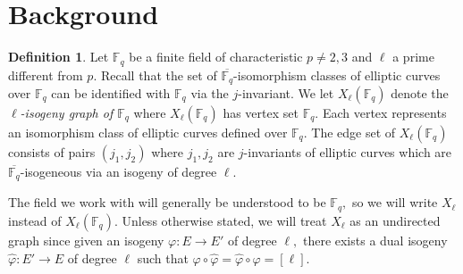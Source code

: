\documentclass[11pt,a4paper]{amsart}
\theoremstyle{plain}
\theoremstyle{definition}
\newtheorem{defn}[thm]{Definition}
\theoremstyle{remark}
\begin{document}
\section{Background}\label{sec:background}
\begin{defn}
  Let $\mathbb{F}_q$ be a finite field of characteristic $p \neq 2,3$ and $\ell$ a prime different from $p.$ Recall that the set of $\overline{\mathbb{F}_q}$-isomorphism classes of elliptic curves over $\mathbb{F}_q$ can be identified with $\mathbb{F}_q$ via the $j$-invariant. We let $X_{\ell}(\mathbb{F}_q)$ denote the \emph{$\ell$-isogeny graph of $\mathbb{F}_q$} where $X_{\ell}(\mathbb{F}_q)$ has vertex set $\mathbb{F}_q.$ Each vertex represents an isomorphism class of elliptic curves defined over $\mathbb{F}_q.$ The edge set of $X_{\ell}(\mathbb{F}_q)$ consists of pairs $(j_1, j_2)$ where $j_1, j_2$ are $j$-invariants of elliptic curves which are $\overline{\mathbb{F}_q}$-isogeneous via an isogeny of degree $\ell.$
\end{defn}
The field we work with will generally be understood to be $\mathbb{F}_q,$ so we will write $X_{\ell}$ instead of $X_{\ell}(\mathbb{F}_q).$ Unless otherwise stated, we will treat $X_{\ell}$ as an undirected graph since given an isogeny $\varphi: E \to E'$ of degree $\ell,$ there exists a dual isogeny $\hat{\varphi}: E' \to E$ of degree $\ell$ such that $\varphi \circ \hat{\varphi} = \hat{\varphi} \circ \varphi = [\ell].$
\end{document}
